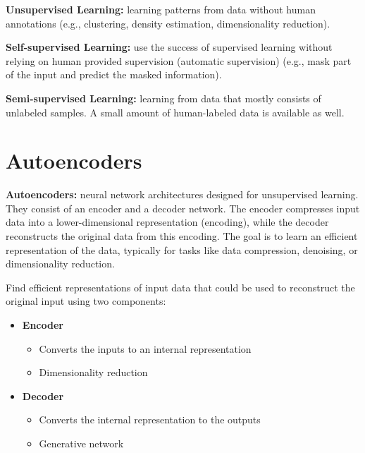 \begin{definition}
    \textbf{Unsupervised Learning:} learning patterns from data without human annotations (e.g., clustering, density estimation, dimensionality reduction).
\end{definition}

\begin{definition}
    \textbf{Self-supervised Learning:} use the success of supervised learning without relying on human provided
supervision (automatic supervision) (e.g., mask part of the input and predict the masked information).
\end{definition}

\begin{definition}
    \textbf{Semi-supervised Learning:} learning from data that mostly consists of unlabeled samples. A small amount of human-labeled data is available as well.
\end{definition}

\section{Autoencoders}

\begin{definition}
    \textbf{Autoencoders:} neural network architectures designed for unsupervised learning. They consist of an encoder and a decoder network. The encoder compresses input data into a lower-dimensional representation (encoding), while the decoder reconstructs the original data from this encoding. The goal is to learn an efficient representation of the data, typically for tasks like data compression, denoising, or dimensionality reduction.
\end{definition}

Find efficient representations of input data that could be used to reconstruct the original input using two components:

\begin{itemize}
    \item \textbf{Encoder}
    \begin{itemize}
        \item Converts the inputs to an internal representation
    \end{itemize}
    \begin{itemize}
        \item Dimensionality reduction
    \end{itemize}
    \item \textbf{Decoder}
    \begin{itemize}
        \item Converts the internal representation to the outputs
    \end{itemize}
    \begin{itemize}
        \item Generative network
    \end{itemize}
\end{itemize}

